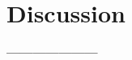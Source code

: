 \documentclass[10pt,sigconf]{acmart}
\begin{document}




\section{Discussion}

\textbf{---------------------}

\end{document}
